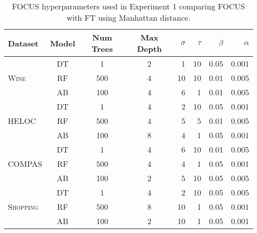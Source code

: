 
\begin{table}[h]
\centering
\caption{FOCUS hyperparameters used in Experiment 1 comparing FOCUS with FT using Manhattan distance.}
\label{table:hyperparameters-manhat}
\begin{tabular}{lcccrrrr}
\toprule
\textbf{Dataset}                   & \textbf{Model}       & \textbf{Num Trees}   & \textbf{Max Depth}   & $\sigma$ & $\tau$ & $\beta$ & $\alpha$ \\ \midrule
                    & DT                   & 1                                  & 2                                  & 1  & 10 & 0.05 & 0.001     	 \\
\textsc{Wine}                   & RF                   & 500                                & 4                                  & 10 & 10 & 0.01 & 0.005    	 \\
\textsc{}                          & AB                   & 100                                & 4                                  & 6  & 1  & 0.01 & 0.005     	 \\ \midrule
\multirow{3}{*}{\textsc{HELOC}}    & DT                   & 1                                  & 4                                 & 2  & 10 & 0.05 & 0.001  	    \\
                                   & RF                   & 500                                & 4                                 & 5  & 5  & 0.01 & 0.005     	\\
                                   & AB                   & 100                                & 8                                  & 4  & 1  & 0.05 & 0.001  	   \\ \midrule
\multirow{3}{*}{\textsc{COMPAS}}   & DT                   & 1                                  & 4                                  & 6  & 10 & 0.01 & 0.005      \\
                                   & RF                   & 500                                & 4                                   & 4  & 1  & 0.05 & 0.001       \\
                                   & AB                   & 100                                & 2                                  & 5  & 10 & 0.05 & 0.005  	\\ \midrule
\multirow{3}{*}{\textsc{Shopping}} & DT                   & 1                                  & 4                                  & 2  & 10 & 0.05 & 0.005    \\
                                   & RF                   & 500                                & 8                                  & 10 & 1  & 0.05 & 0.001       \\
                                   & AB                   & 100                                & 2                                  & 10 & 1  & 0.05 & 0.001     \\ \bottomrule
\end{tabular}
\end{table}


